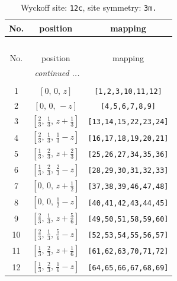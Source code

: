 \documentclass[fleqn,8pt]{jsarticle}
\begin{document}
\begin{longtable}{ccc}
\caption{Wyckoff site: {\tt 12c}, site symmetry: {\tt 3m.}}
 \\
 \hline \hline
No. & position & mapping \\ \hline \endfirsthead

\multicolumn{2}{l}{\tablename\ \thetable{}} \\
 \hline \hline
No. & position & mapping \\ \hline \endhead

 \hline \hline
\multicolumn{2}{r}{\footnotesize\it continued ...} \\ \endfoot

 \hline \hline
\multicolumn{2}{r}{} \\ \endlastfoot

1 & $\left[ 0,\, 0,\, z \right]$ & {\tt [1,2,3,10,11,12]} \\ \hline
2 & $\left[ 0,\, 0,\, - z \right]$ & {\tt [4,5,6,7,8,9]} \\ \hline
3 & $\left[ \frac{2}{3},\, \frac{1}{3},\, z + \frac{1}{3} \right]$ & {\tt [13,14,15,22,23,24]} \\ \hline
4 & $\left[ \frac{2}{3},\, \frac{1}{3},\, \frac{1}{3} - z \right]$ & {\tt [16,17,18,19,20,21]} \\ \hline
5 & $\left[ \frac{1}{3},\, \frac{2}{3},\, z + \frac{2}{3} \right]$ & {\tt [25,26,27,34,35,36]} \\ \hline
6 & $\left[ \frac{1}{3},\, \frac{2}{3},\, \frac{2}{3} - z \right]$ & {\tt [28,29,30,31,32,33]} \\ \hline
7 & $\left[ 0,\, 0,\, z + \frac{1}{2} \right]$ & {\tt [37,38,39,46,47,48]} \\ \hline
8 & $\left[ 0,\, 0,\, \frac{1}{2} - z \right]$ & {\tt [40,41,42,43,44,45]} \\ \hline
9 & $\left[ \frac{2}{3},\, \frac{1}{3},\, z + \frac{5}{6} \right]$ & {\tt [49,50,51,58,59,60]} \\ \hline
10 & $\left[ \frac{2}{3},\, \frac{1}{3},\, \frac{5}{6} - z \right]$ & {\tt [52,53,54,55,56,57]} \\ \hline
11 & $\left[ \frac{1}{3},\, \frac{2}{3},\, z + \frac{1}{6} \right]$ & {\tt [61,62,63,70,71,72]} \\ \hline
12 & $\left[ \frac{1}{3},\, \frac{2}{3},\, \frac{1}{6} - z \right]$ & {\tt [64,65,66,67,68,69]} \\
\end{longtable}
\renewcommand{\arraystretch}{1.2}
\end{document}
